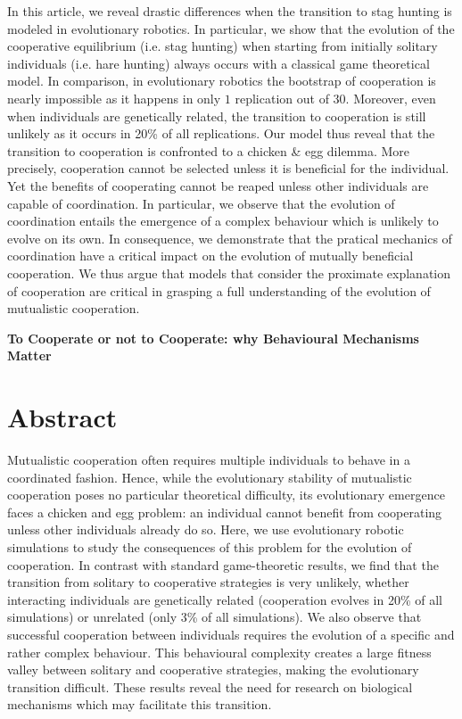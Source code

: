In this article, we reveal drastic differences when the transition to stag hunting is modeled in evolutionary robotics. In particular, we show that the evolution of the cooperative equilibrium (i.e. stag hunting) when starting from initially solitary individuals (i.e. hare hunting) always occurs with a classical game theoretical model. In comparison, in evolutionary robotics the bootstrap of cooperation is nearly impossible as it happens in only $1$ replication out of $30$. Moreover, even when individuals are genetically related, the transition to cooperation is still unlikely as it occurs in 20\% of all replications. Our model thus reveal that the transition to cooperation is confronted to a chicken \& egg dilemma. More precisely, cooperation cannot be selected unless it is beneficial for the individual. Yet the benefits of cooperating cannot be reaped unless other individuals are capable of coordination. In particular, we observe that the evolution of coordination entails the emergence of a complex behaviour which is unlikely to evolve on its own. In consequence, we demonstrate that the pratical mechanics of coordination have a critical impact on the evolution of mutually beneficial cooperation. We thus argue that models that consider the proximate explanation of cooperation are critical in grasping a full understanding of the evolution of mutualistic cooperation.

\clearpage

\begin{flushleft}
\textbf{\Huge To Cooperate or not to Cooperate: why Behavioural Mechanisms Matter}
\end{flushleft}


\section{Abstract}
  Mutualistic cooperation often requires multiple individuals to behave in a coordinated fashion. Hence, while the evolutionary stability of mutualistic cooperation poses no particular theoretical difficulty, its evolutionary emergence faces a chicken and egg problem: an individual cannot benefit from cooperating unless other individuals already do so. Here, we use evolutionary robotic simulations to study the consequences of this problem for the evolution of cooperation. In contrast with standard game-theoretic results, we find that the transition from solitary to cooperative strategies is very unlikely, whether interacting individuals are genetically related (cooperation evolves in 20\% of all simulations) or unrelated (only 3\% of all simulations). We also observe that successful cooperation between individuals requires the evolution of a specific and rather complex behaviour. This behavioural complexity creates a large fitness valley between solitary and cooperative strategies, making the evolutionary transition difficult. These results reveal the need for research on biological mechanisms which may facilitate this transition.


